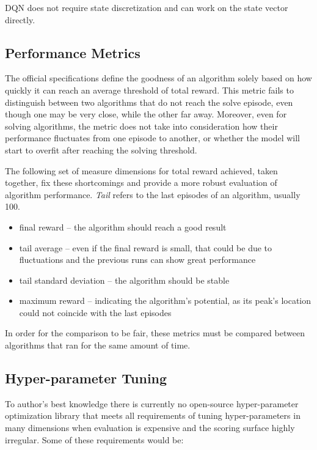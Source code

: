 \documentclass{article}
\begin{document}
DQN does not require state discretization and can work on the state vector directly.

\subsection{Performance Metrics}
\label{ssec:metrics}

The official specifications define the goodness of an algorithm solely based on how quickly it can reach an average threshold of total reward. This metric fails to distinguish between two algorithms that do not reach the solve episode, even though one may be very close, while the other far away. Moreover, even for solving algorithms, the metric does not take into consideration how their performance fluctuates from one episode to another, or whether the model will start to overfit after reaching the solving threshold.

The following set of measure dimensions for total reward achieved, taken together, fix these shortcomings and provide a more robust evaluation of algorithm performance. \textit{Tail} refers to the last episodes of an algorithm, usually 100.

\begin{itemize}
  \item final reward -- the algorithm should reach a good result
  \item tail average -- even if the final reward is small, that could be due to fluctuations and the previous runs can show great performance
  \item tail standard deviation -- the algorithm should be stable
  \item maximum reward -- indicating the algorithm's potential, as its peak's location could not coincide with the last episodes
\end{itemize}

In order for the comparison to be fair, these metrics must be compared between algorithms that ran for the same amount of time.


\subsection{Hyper-parameter Tuning}
\label{ssec:tuning}

To author's best knowledge there is currently no open-source hyper-parameter optimization library that meets all requirements of tuning hyper-parameters in many dimensions when evaluation is expensive and the scoring surface highly irregular. Some of these requirements would be:
\end{document}
